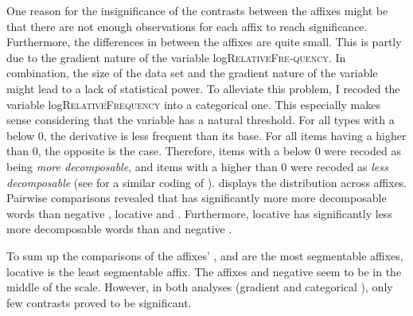One reason for the insignificance of the contrasts between the affixes might be that there are not enough observations for each affix to reach significance. Furthermore, the differences in  between the affixes are quite small. This is partly due to the gradient nature of the variable log\textsc{RelativeFre-quency}. In combination, the size of the data set and the gradient nature of the variable might lead to a lack of statistical power. 
To alleviate this problem, I recoded the variable log\textsc{RelativeFrequency} into a categorical one. This especially makes sense considering that the variable has a natural threshold. For all types with a  below 0, the derivative is less frequent than its base. For all items having a  higher than 0, the opposite is the case. Therefore, items with a  below 0 were recoded as being \textit{more decomposable}, and items with a  higher than 0 were recoded as \textit{less decomposable }(see \citealt{Hay.2001,Collie.2008} for a similar coding of ).  displays the distribution across affixes.
Pairwise comparisons revealed that  has significantly more {more decomposable} words  than negative , locative  and . Furthermore, locative  has significantly less {more decomposable} words than  and negative . 







To sum up the comparisons of the affixes' ,  and  are the most segmentable affixes, locative  is the least segmentable affix. The affixes  and negative  seem to be in the middle of the scale. However, in both analyses (gradient and categorical ), only few contrasts proved to be significant.






